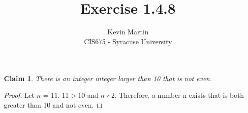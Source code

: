 \documentclass{article}
\author{Kevin Martin\\ CIS675 - Syracuse University}
\title{Exercise 1.4.8}
\newtheorem*{claim}{Claim}
\begin{document}
\maketitle
\begin{claim}
There is an integer integer larger than 10 that is not even.
\end{claim}
 
\begin{proof}
  Let $n$ = 11. \(11>10\) and \(n\nmid 2\). Therefore, a number n exists that is both greater than 10 and not even.
\end{proof}
\end{document}
